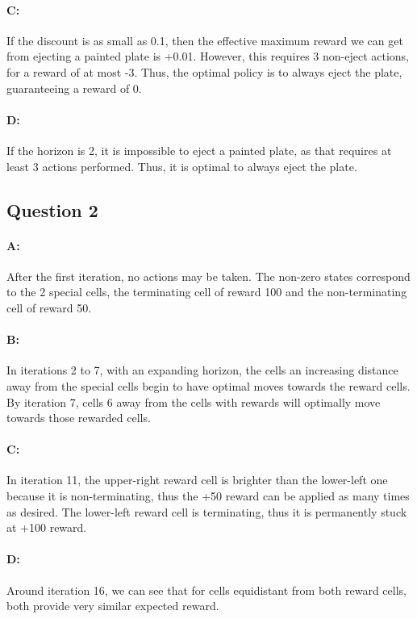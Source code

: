 \documentclass{article}
\begin{document}
\paragraph{C: } If the discount is as small as 0.1, then the effective maximum reward we can get from ejecting a painted plate is +0.01. However, this requires 3 non-eject actions, for a reward of at most -3. Thus, the optimal policy is to always eject the plate, guaranteeing a reward of 0.

\paragraph{D: } If the horizon is 2, it is impossible to eject a painted plate, as that requires at least 3 actions performed. Thus, it is optimal to always eject the plate.

\subsection{Question 2}

\paragraph{A: } After the first iteration, no actions may be taken. The non-zero states correspond to the 2 special cells, the terminating cell of reward 100 and the non-terminating cell of reward 50.

\paragraph{B: } In iterations 2 to 7, with an expanding horizon, the cells an increasing distance away from the special cells begin to have optimal moves towards the reward cells. By iteration 7, cells $6$ away from the cells with rewards will optimally move towards those rewarded cells.

\paragraph{C: } In iteration 11, the upper-right reward cell is brighter than the lower-left one because it is non-terminating, thus the +50 reward can be applied as many times as desired. The lower-left reward cell is terminating, thus it is permanently stuck at +100 reward.

\paragraph{D: } Around iteration 16, we can see that for cells equidistant from both reward cells, both provide very similar expected reward.
\end{document}
